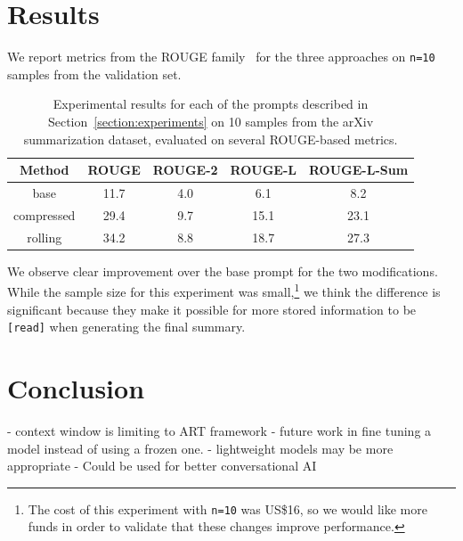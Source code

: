 \documentclass{article}
\begin{document}
\section{Results}

We report metrics from the ROUGE family~\cite{lin-hovy-2003-automatic,ganesan2015rouge} for the three approaches on \texttt{n=10} samples from the validation set.

\begin{table}[!ht]
  \centering
  \begin{tabular}{c|c|c|c|c}
    \textbf{Method} & \textbf{ROUGE} & \textbf{ROUGE-2} & \textbf{ROUGE-L} & \textbf{ROUGE-L-Sum} \\
    \hline
    base            & 11.7           & 4.0              & 6.1              & 8.2                  \\
    compressed      & 29.4           & 9.7              & 15.1             & 23.1                 \\
    rolling         & 34.2           & 8.8              & 18.7             & 27.3                 \\
  \end{tabular}
  \vspace{0.5cm}
  \caption{Experimental results for each of the prompts described in Section~\ref{section:experiments} on 10 samples from the arXiv summarization dataset, evaluated on several ROUGE-based metrics.}\label{tab:results}
\end{table}

We observe clear improvement over the base prompt for the two modifications. While the sample size for this experiment was small,\footnote{The cost of this experiment with \texttt{n=10} was US\$16, so we would like more funds in order to validate that these changes improve performance.} we think the difference is significant because they make it possible for more stored information to be \texttt{[read]} when generating the final summary.



\section{Conclusion}

- context window is limiting to ART framework
- future work in fine tuning a model instead of using a frozen one.
- lightweight models may be more appropriate
- Could be used for better conversational AI
\end{document}
